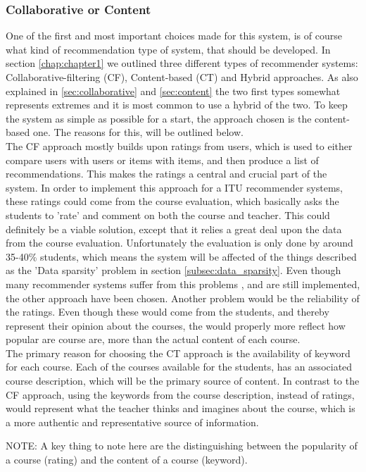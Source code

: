 \subsubsection*{Collaborative or Content}
One of the first and most important choices made for this system, is of course what kind of recommendation type of system, that should be developed. In section \ref{chap:chapter1} we outlined three different types of recommender systems: Collaborative-filtering (CF), Content-based (CT) and Hybrid approaches. As also explained in \ref{sec:collaborative} and \ref{sec:content} the two first types somewhat represents extremes and it is most common to use a hybrid of the two. To keep the system as simple as possible for a start, the approach chosen is the content-based one. The reasons for this, will be outlined below. \\
The CF approach mostly builds upon ratings from users, which is used to either compare users with users or items with items, and then produce a list of recommendations. This makes the ratings a central and crucial part of the system. In order to implement this approach for a ITU recommender systems, these ratings could come from the course evaluation, which basically asks the students to 'rate' and comment on both the course and teacher. This could definitely be a viable solution, except that it relies a great deal upon the data from the course evaluation. Unfortunately the evaluation is only done by around 35-40\% students, which means the system will be affected of the things described as the 'Data sparsity' problem in section \ref{subsec:data_sparsity}. Even though many recommender systems suffer from this problems , and are still implemented, the other approach have been chosen. Another problem would be the reliability of the ratings. Even though these would come from the students, and thereby represent their opinion about the courses, the would properly more reflect how popular are course are, more than the actual content of each course.\\ 
The primary reason for choosing the CT approach is the availability of keyword for each course. Each of the courses available for the students, has an associated course description, which will be the primary source of content. In contrast to the CF approach, using the keywords from the course description, instead of ratings, would represent what the teacher thinks and imagines about the course, which is a more authentic and representative source of information. 

NOTE: A key thing to note here are the distinguishing between the popularity of a course (rating) and the content of a course (keyword).

